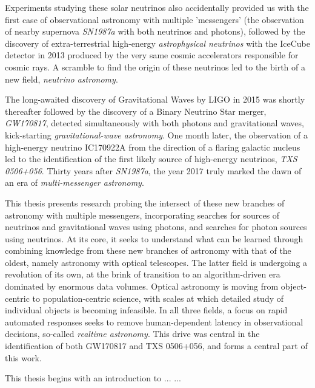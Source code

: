 Experiments studying these solar neutrinos also accidentally provided us with the first case of observational astronomy with multiple 'messengers' (the observation of nearby supernova \emph{SN1987a} with both neutrinos and photons), followed by the discovery of extra-terrestrial high-energy \emph{astrophysical neutrinos} with the IceCube detector in 2013 produced by the very same cosmic accelerators responsible for cosmic rays. A scramble to find the origin of these neutrinos led to the birth of a new field, \emph{neutrino astronomy}. 

The long-awaited discovery of Gravitational Waves by LIGO in 2015 was shortly thereafter followed by the discovery of a Binary Neutrino Star merger, \emph{GW170817}, detected simultaneously with both photons and gravitational waves, kick-starting \emph{gravitational-wave astronomy}. One month later, the observation of a high-energy neutrino IC170922A from the direction of a flaring galactic nucleus led to the identification of the first likely source of high-energy neutrinos, \emph{TXS 0506+056}. Thirty years after \emph{SN1987a}, the year 2017 truly marked the dawn of an era of \emph{multi-messenger astronomy}. 

This thesis presents research probing the intersect of these new branches of astronomy with multiple messengers, incorporating searches for sources of neutrinos and gravitational waves using photons, and searches for photon sources using neutrinos. At its core, it seeks to understand what can be learned through combining knowledge from these new branches of astronomy with that of the oldest, namely astronomy with optical telescopes. The latter field is undergoing a revolution of its own, at the brink of transition to an algorithm-driven era dominated by enormous data volumes. Optical astronomy is moving from object-centric to population-centric science, with scales at which detailed study of individual objects is becoming infeasible. In all three fields, a focus on rapid automated responses seeks to remove human-dependent latency in observational decisions, so-called \emph{realtime astronomy}. This drive was central in the identification of both GW170817 and TXS 0506+056, and forms a central part of this work.

This thesis begins with an introduction to ...
...



